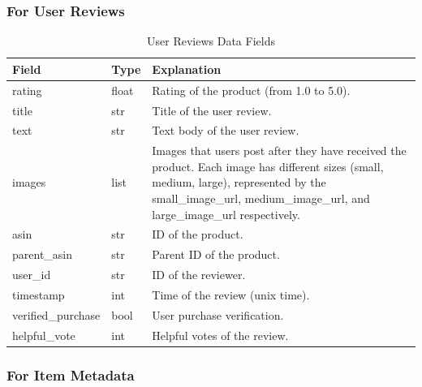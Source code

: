 \documentclass[11pt,a4paper,openany,oneside,titlepage]{article}
\begin{document}
\subsubsection{For User Reviews}
\begin{table}[h!]
  \centering
  \begin{tabular}{|l|l|p{8cm}|}
  \hline
  \textbf{Field} & \textbf{Type} & \textbf{Explanation} \\ \hline
  rating & float & Rating of the product (from 1.0 to 5.0). \\ \hline
  title & str & Title of the user review. \\ \hline
  text & str & Text body of the user review. \\ \hline
  images & list & Images that users post after they have received the product. Each image has different sizes (small, medium, large), represented by the small\_image\_url, medium\_image\_url, and large\_image\_url respectively. \\ \hline
  asin & str & ID of the product. \\ \hline
  parent\_asin & str & Parent ID of the product. \\ \hline
  user\_id & str & ID of the reviewer. \\ \hline
  timestamp & int & Time of the review (unix time). \\ \hline
  verified\_purchase & bool & User purchase verification. \\ \hline
  helpful\_vote & int & Helpful votes of the review. \\ \hline
  \end{tabular}
  \caption{User Reviews Data Fields}
  \label{table:user_reviews}
  \end{table}
  
\subsubsection{For Item Metadata}
\end{document}
